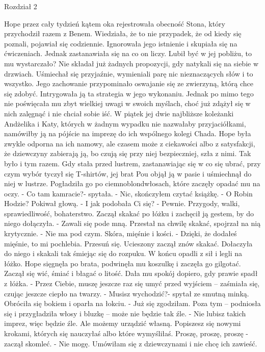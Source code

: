 \documentclass[12pt,a4paper]{book}
\begin{document}
Rozdział 2

Hope przez cały tydzień kątem oka rejestrowała obecność Stona, który przychodził razem z Benem. Wiedziała, że to nie przypadek, że od kiedy się poznali, pojawiał się codziennie. Ignorowała jego istnienie i skupiała się na ćwiczeniach. Jednak zastanawiała się na co on liczy. Lubił być w jej pobliżu, to mu wystarczało? Nie składał już żadnych propozycji, gdy natykali się na siebie w drzwiach. Uśmiechał się przyjaźnie, wymieniali parę nic nieznaczących słów i to wszystko. Jego zachowanie przypominało oswajanie się ze zwierzyną, którą chce się zdobyć. Intrygowała ją ta strategia w jego wykonaniu. Jednak po mimo tego nie poświęcała mu zbyt wielkiej uwagi w swoich myślach, choć już zdążył się w nich zalęgnąć i nie chciał sobie iść. 
W piątek jej dwie najbliższe koleżanki Andżelika i Katy, których w żadnym wypadku nie nazwałaby przyjaciółkami, namówiłby ją na pójście na imprezę do ich wspólnego kolegi Chada. Hope była zwykle odporna na ich namowy, ale czasem może z ciekawości albo z satysfakcji, że dziewczyny zabierają ją, bo czują się przy niej bezpieczniej, szła z nimi. Tak było i tym razem. 
Gdy stała przed lustrem, zastanawiając się w co się ubrać, przy czym wybór tyczył się T-shirtów, jej brat Pou objął ją w pasie i uśmiechnął do niej w lustrze. Pogładziła go po ciemnoblondwłosach, które zaczęły opadać mu na oczy.
- Co tam kamracie?- spytała. 
- Nic, skończyłem czytać książkę.
- O Robin Hodzie?
Pokiwał głową.
- I jak podobała Ci się?
- Pewnie. Przygody, walki, sprawiedliwość, bohaterstwo.
Zaczął skakać po łóżku i zachęcił ją gestem, by do niego dołączyła. 
- Zawali się pode mną. 
Przestał na chwilę skakać, spojrzał na nią krytycznie. 
- Nie ma pod czym. Skóra, mięśnie i kości. 
- Dzięki, że dodałeś mięśnie, to mi pochlebia. Przesuń się. 
Ucieszony zaczął znów skakać. Dołaczyła do niego i skakali tak śmiejąc się do rozpuku. W końcu opadli z sił i legli na łóżko. Hope sięgnęła po brata, podwinęła mu koszulkę i zaczęła go gilgotać. Zaczął się wić, śmiać i błagać o litość. Dała mu spokój dopiero, gdy prawie spadł z łóżka. 
- Przez Ciebie, muszę jeszcze raz się umyć przed wyjściem – zaśmiała się, czując jeszcze ciepło na twarzy. 
- Musisz wychodzić?- spytał ze smutną minką. 
Obróciła się bokiem i oparła na łokciu.
- Już się zgodziłam. Poza tym – podniosła się i przygładziła włosy i bluzkę – może nie będzie tak źle. 
- Nie lubisz takich imprez, więc będzie źle. Ale możemy urządzić własną. Popiszesz się nowymi krokami, których się nauczyłaś albo które wymyśliłaś. Proszę, proszę, proszę - zaczął skomleć. 
- Nie mogę. Umówiłam się z dziewczynami i nie chcę ich zawieść. 
\end{document}
